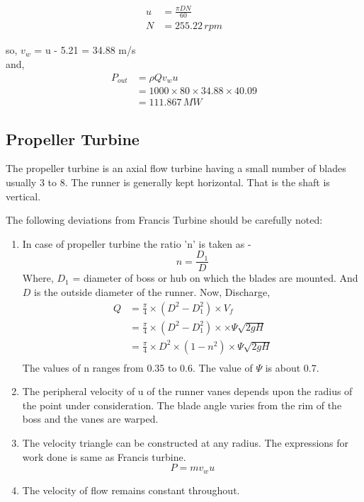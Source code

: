 \documentclass{article}
\begin{document}
\begin{multicols}{2}
  \begin{align}
    u &= \frac{\pi D N}{60} \\
    N &= 255.22 \, rpm
  \end{align}
  
  so, $v_w$ = u - 5.21 = 34.88 m/s \\
  and, 
  \begin{align*}
    P_{out} &= \rho Q v_w  u \\
    &= 1000 \times 80 \times 34.88 \times 40.09 \\
    &= 111.867 \, MW
  \end{align*}
\end{multicols}
\pagebreak
\subsection*{Propeller Turbine}
\begin{multicols}{2}
  The propeller turbine is an axial flow turbine having a small number of blades usually 3 to 8. The runner is generally kept horizontal. That is the shaft is vertical.
  
  The following deviations from Francis Turbine should be carefully noted:\\

  \begin{enumerate}
    \item In case of propeller turbine the ratio 'n' is taken as - $$n = \frac{D_1}{D}$$ Where, $D_1$ = diameter of boss or hub on which the blades are mounted. And $D$ is the outside diameter of the runner.
    Now, Discharge, 
    \begin{align*}
      Q &= \frac{\pi}{4} \times (D^2 - D_1^2) \times V_f \\
      &= \frac{\pi}{4} \times (D^2 - D_1^2) \times \times \Psi \sqrt{2gH} \\
      &= \frac{\pi}{4} \times D^2 \times ( 1 - n^2) \times \Psi \sqrt{2gH} \\
    \end{align*} 
    The values of n ranges from 0.35 to 0.6. The value of $\Psi$ is about 0.7. 

    \item The peripheral velocity of u of the runner vanes depends upon the radius of the point under consideration. The blade angle varies from the rim of the boss and the vanes are warped. 
    \item The velocity triangle can be constructed at any radius. The expressions for work done is same as Francis turbine. 
    $$P = m v_w u $$

    \item The velocity of flow remains constant throughout.
  \end{enumerate}

\end{multicols}
  
\end{document}
